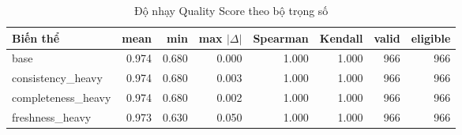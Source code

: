 \begin{table}[H]\centering\small
\caption{Độ nhạy Quality Score theo bộ trọng số}\label{tab:w10-quality}
\begin{tabular}{lrrrrrrr}\toprule
Biến thể & mean & min & max $|\Delta|$ & Spearman & Kendall & valid & eligible \\\midrule
base & 0.974 & 0.680 & 0.000 & 1.000 & 1.000 & 966 & 966 \\
consistency\_heavy & 0.974 & 0.680 & 0.003 & 1.000 & 1.000 & 966 & 966 \\
completeness\_heavy & 0.974 & 0.680 & 0.002 & 1.000 & 1.000 & 966 & 966 \\
freshness\_heavy & 0.973 & 0.630 & 0.050 & 1.000 & 1.000 & 966 & 966 \\
\bottomrule\end{tabular}
\end{table}
